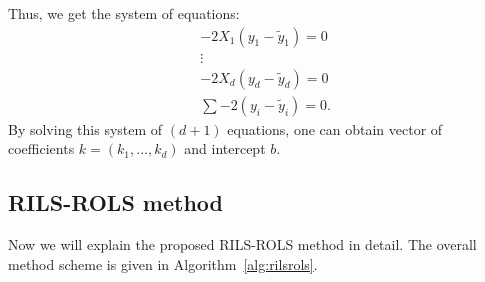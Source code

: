 \documentclass[a4paper,12pt]{elsarticle}
\begin{document}
    Thus, we get the system of equations: 
    \begin{align*}
    	  & -2X_1 (y_1 - \tilde{y}_1)  = 0 \\
    	  & \vdots \\
    	  & -2X_d (y_d - \tilde{y}_d)  = 0 \\
    	  &\sum -2  (y_i - \tilde{y}_i) = 0.
    \end{align*}
     By solving this system of $(d+1)$ equations, one can obtain vector of coefficients $k=(k_1, ..., k_d)$ and intercept $b$. %
   \subsection{RILS-ROLS method}
   Now we will explain the proposed RILS-ROLS method in detail. The overall method scheme is given in Algorithm~\ref{alg:rilsrols}.  
   
\end{document}
